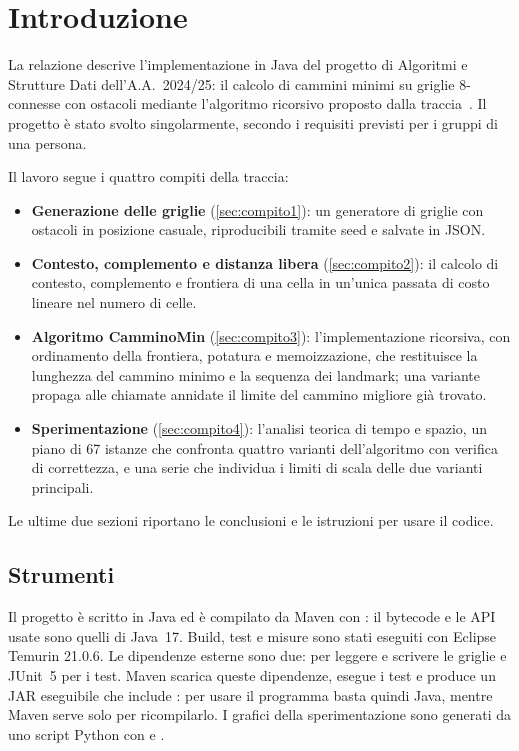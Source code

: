 \section{Introduzione}
\label{sec:introduzione}

La relazione descrive l'implementazione in Java del progetto di Algoritmi e
Strutture Dati dell'A.A.\ 2024/25: il calcolo di cammini minimi su griglie
8-connesse con ostacoli mediante l'algoritmo ricorsivo \cmin{} proposto
dalla traccia~\cite{traccia}. Il progetto è stato svolto singolarmente,
secondo i requisiti previsti per i gruppi di una persona.

Il lavoro segue i quattro compiti della traccia:

\begin{itemize}
  \item \textbf{Generazione delle griglie} (\cref{sec:compito1}): un
        generatore di griglie con ostacoli in posizione casuale,
        riproducibili tramite seed e salvate in JSON.
  \item \textbf{Contesto, complemento e distanza libera}
        (\cref{sec:compito2}): il calcolo di contesto, complemento e
        frontiera di una cella in un'unica passata di costo lineare nel
        numero di celle.
  \item \textbf{Algoritmo CamminoMin} (\cref{sec:compito3}): l'implementazione
        ricorsiva, con ordinamento della frontiera, potatura e
        memoizzazione, che restituisce la lunghezza del cammino minimo e la
        sequenza dei landmark; una variante propaga alle chiamate annidate
        il limite del cammino migliore già trovato.
  \item \textbf{Sperimentazione} (\cref{sec:compito4}): l'analisi teorica di
        tempo e spazio, un piano di 67 istanze che confronta quattro varianti
        dell'algoritmo con verifica di correttezza, e una serie che individua
        i limiti di scala delle due varianti principali.
\end{itemize}

Le ultime due sezioni riportano le conclusioni e le istruzioni per usare il
codice.

\subsection{Strumenti}

Il progetto è scritto in Java ed è compilato da Maven con :
il bytecode e le API usate sono quelli di Java~17. Build, test e misure sono
stati eseguiti con Eclipse Temurin 21.0.6. Le dipendenze esterne sono due:
 per leggere e scrivere le griglie e JUnit~5 per i test.
Maven scarica queste dipendenze, esegue i test e produce un JAR eseguibile
che include : per usare il programma basta quindi Java,
mentre Maven serve solo per ricompilarlo. I grafici della sperimentazione
sono generati da uno script Python con  e .

